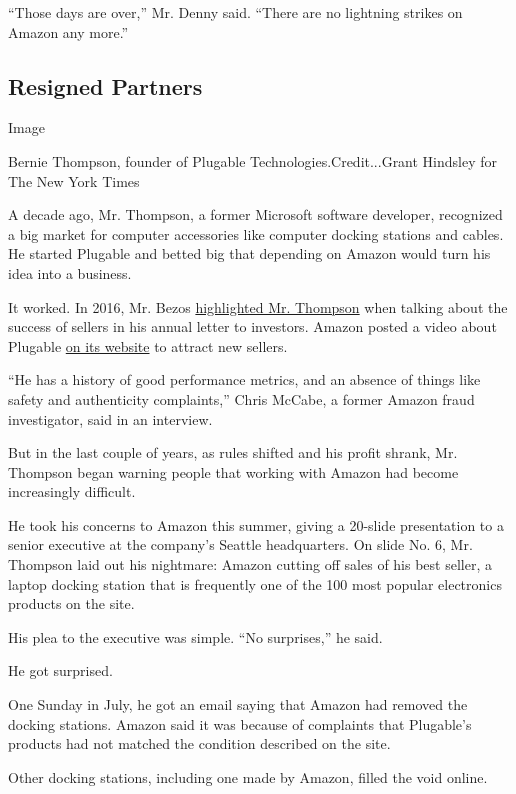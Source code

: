 ``Those days are over,'' Mr. Denny said. ``There are no lightning
strikes on Amazon any more.''

\hypertarget{resigned-partners}{%
\subsection{Resigned Partners}\label{resigned-partners}}

Image

Bernie Thompson, founder of Plugable Technologies.Credit...Grant
Hindsley for The New York Times

A decade ago, Mr. Thompson, a former Microsoft software developer,
recognized a big market for computer accessories like computer docking
stations and cables. He started Plugable and betted big that depending
on Amazon would turn his idea into a business.

It worked. In 2016, Mr. Bezos
\href{https://www.sec.gov/Archives/edgar/data/1018724/000119312516530910/d168744dex991.htm}{highlighted
Mr. Thompson} when talking about the success of sellers in his annual
letter to investors. Amazon posted a video about Plugable
\href{https://services.amazon.com/stories.html}{on its website} to
attract new sellers.

``He has a history of good performance metrics, and an absence of things
like safety and authenticity complaints,'' Chris McCabe, a former Amazon
fraud investigator, said in an interview.

But in the last couple of years, as rules shifted and his profit shrank,
Mr. Thompson began warning people that working with Amazon had become
increasingly difficult.

He took his concerns to Amazon this summer, giving a 20-slide
presentation to a senior executive at the company's Seattle
headquarters. On slide No. 6, Mr. Thompson laid out his nightmare:
Amazon cutting off sales of his best seller, a laptop docking station
that is frequently one of the 100 most popular electronics products on
the site.

His plea to the executive was simple. ``No surprises,'' he said.

He got surprised.

One Sunday in July, he got an email saying that Amazon had removed the
docking stations. Amazon said it was because of complaints that
Plugable's products had not matched the condition described on the site.

Other docking stations, including one made by Amazon, filled the void
online.

